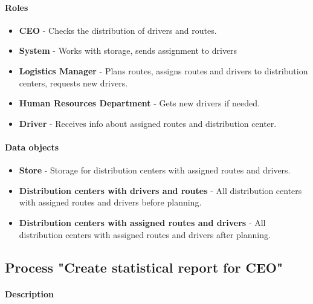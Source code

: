 \documentclass[11pt,a4paper]{article}
\begin{document}
\paragraph{Roles}

\begin{itemize}
    \item \textbf{CEO} - Checks the distribution of drivers and routes.
    \item \textbf{System} - Works with storage, sends assignment to drivers
    \item \textbf{Logistics Manager} - Plans routes, assigns routes and drivers to distribution centers, requests new drivers.
    \item \textbf{Human Resources Department} - Gets new drivers if needed.
    \item \textbf{Driver} - Receives info about assigned routes and distribution center.
\end{itemize}

\paragraph{Data objects}

\begin{itemize}
    \item \textbf{Store} - Storage for distribution centers with assigned routes and drivers.
    \item \textbf{Distribution centers with drivers and routes} - All distribution centers with assigned routes and drivers before planning.
    \item \textbf{Distribution centers with assigned routes and drivers} - All distribution centers with assigned routes and drivers after planning.
\end{itemize}

\newpage




\subsection{Process "Create statistical report for CEO"}

\paragraph{Description}
\end{document}
